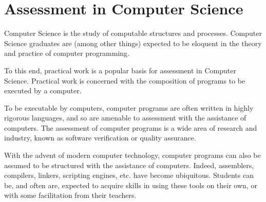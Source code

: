 
\section{Assessment in Computer Science}

Computer Science is the study of computable structures and processes. Computer
Science graduates are (among other things) expected to be eloquent in the
theory and practice of computer programming\cite{cs-curricula-2013}.

To this end, practical work is a popular basis for assessment in Computer
Science\cite{carter-et-al-2003}. Practical work is concerned with the
composition of programs to be executed by a computer.

To be executable by computers, computer programs are often written in highly
rigorous languages, and so are amenable to assessment with the assistance of
computers. The assessment of computer programs is a wide area of research and
industry, known as software verification or quality assurance.

With the advent of modern computer technology, computer programs can also be
assumed to be structured with the assistance of computers. Indeed, assemblers,
compilers, linkers, scripting engines, etc. have become ubiquitous. Students
can be, and often are, expected to acquire skills in using these tools on their
own, or with some facilitation from their teachers.

